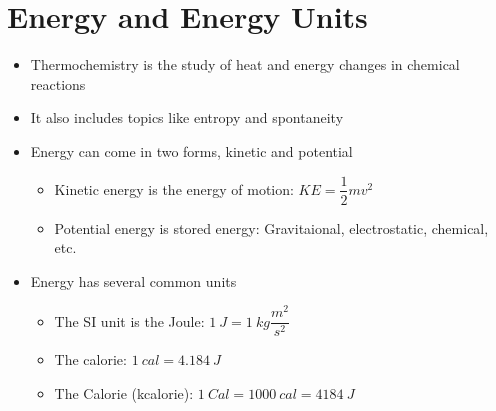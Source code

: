 \documentclass[12pt, openany, letterpaper]{memoir}
\begin{document}
\section{Energy and Energy Units}
\begin{itemize}
	\item Thermochemistry is the study of heat and energy changes in chemical reactions
	\item It also includes topics like entropy and spontaneity
	\item Energy can come in two forms, kinetic and potential
	\begin{itemize}
		\item Kinetic energy is the energy of motion: $KE=\dfrac{1}{2}mv^2$
		\item Potential energy is stored energy: Gravitaional, electrostatic, chemical, etc.
	\end{itemize}
	\item Energy has several common units
	\begin{itemize}
		\item The SI unit is the Joule: $1~J=1~kg\dfrac{m^2}{s^2}$
		\item The calorie: $1~cal=4.184~J$
		\item The Calorie (kcalorie): $1~Cal=1000~cal=4184~J$
	\end{itemize}
\end{itemize}
\end{document}
